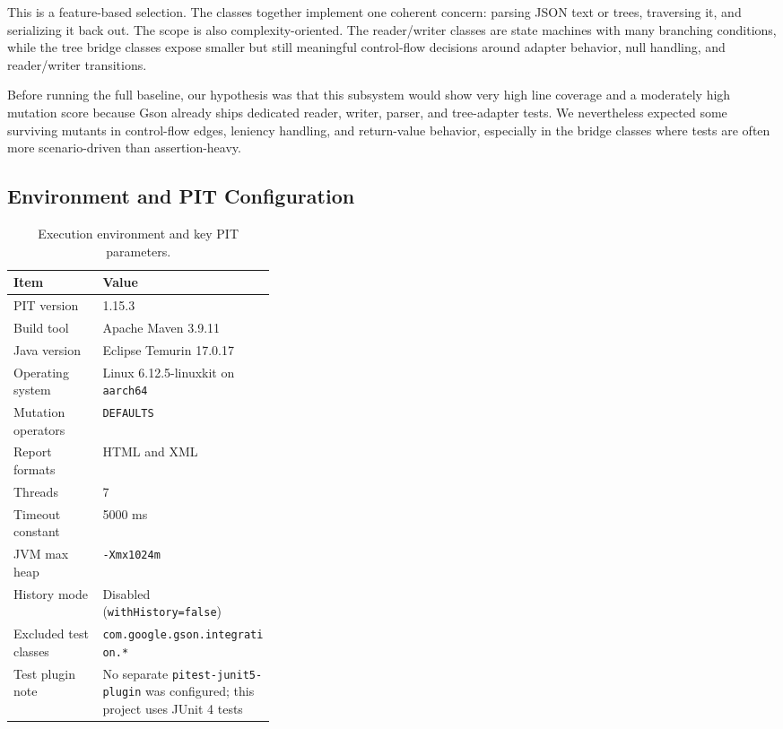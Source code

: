 \documentclass[11pt]{article}
\begin{document}
This is a feature-based selection. The classes together implement one coherent concern: parsing JSON text or trees, traversing it, and serializing it back out. The scope is also complexity-oriented. The reader/writer classes are state machines with many branching conditions, while the tree bridge classes expose smaller but still meaningful control-flow decisions around adapter behavior, null handling, and reader/writer transitions.

Before running the full baseline, our hypothesis was that this subsystem would show very high line coverage and a moderately high mutation score because Gson already ships dedicated reader, writer, parser, and tree-adapter tests. We nevertheless expected some surviving mutants in control-flow edges, leniency handling, and return-value behavior, especially in the bridge classes where tests are often more scenario-driven than assertion-heavy.

\subsection{Environment and PIT Configuration}
\begin{table}[H]
\centering
\small
\begin{tabularx}{\linewidth}{>{\raggedright\arraybackslash}p{0.34\linewidth}X}
\toprule
Item & Value \\
\midrule
PIT version & 1.15.3 \\
Build tool & Apache Maven 3.9.11 \\
Java version & Eclipse Temurin 17.0.17 \\
Operating system & Linux 6.12.5-linuxkit on \texttt{aarch64} \\
Mutation operators & \texttt{DEFAULTS} \\
Report formats & HTML and XML \\
Threads & 7 \\
Timeout constant & 5000 ms \\
JVM max heap & \texttt{-Xmx1024m} \\
History mode & Disabled (\texttt{withHistory=false}) \\
Excluded test classes & \texttt{com.google.gson.integration.*} \\
Test plugin note & No separate \texttt{pitest-junit5-plugin} was configured; this project uses JUnit 4 tests \\
\bottomrule
\end{tabularx}
\caption{Execution environment and key PIT parameters.}
\end{table}
\end{document}
